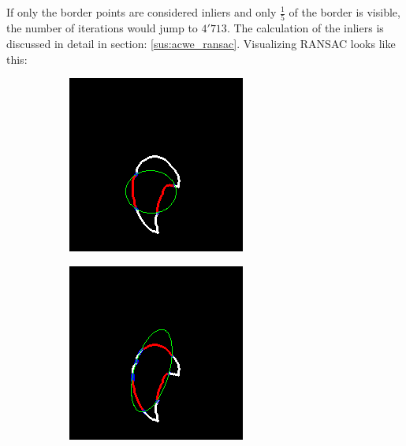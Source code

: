 If only the border points are considered inliers and only $\frac{1}{5}$ of the border is visible, the number of iterations would jump to $4'713$. The calculation of the inliers is discussed in detail in section: \ref{sus:acwe_ransac}.
\newpage
Visualizing RANSAC looks like this:
\begin{figure}[h]
    \centering
    \begin{subfigure}{0.3\textwidth}
        \centering
        \includegraphics[width=0.9\linewidth]{plots/ransac/test_mask98.png}

    \end{subfigure}%
    \hfill
    \begin{subfigure}{0.3\textwidth}
        \centering
        \includegraphics[width=0.9\linewidth]{plots/ransac/test_mask186.png}


\end{subfigure}
\end{figure}
